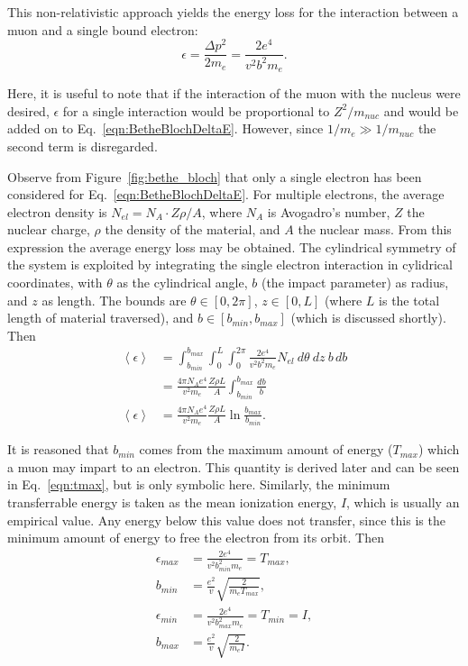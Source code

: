 This non-relativistic approach yields the energy loss for the interaction between a muon and a single bound electron:
\begin{equation}\label{eqn:BetheBlochDeltaE}
\epsilon=\frac{\Delta p^2}{2m_e}=\frac{2e^4}{v^2 b^2 m_e}.
\end{equation}

Here, it is useful to note that if the interaction of the muon with the nucleus were desired, $\epsilon$ for a single interaction would be proportional to $Z^2/m_{nuc}$ and would be added on to Eq.~\eqref{eqn:BetheBlochDeltaE}. However, since $1/m_e \gg 1/m_{nuc}$ the second term is disregarded.

Observe from Figure~\ref{fig:bethe_bloch} that only a single electron has been considered for Eq.~\eqref{eqn:BetheBlochDeltaE}. For multiple electrons, the average electron density is $N_{el}=N_A\cdot Z\rho/A$, where $N_A$ is Avogadro's number, $Z$ the nuclear charge, $\rho$ the density of the material, and $A$ the nuclear mass. From this expression the average energy loss may be obtained. The cylindrical symmetry of the system is exploited by integrating the single electron interaction in cylidrical coordinates, with $\theta$ as the cylindrical angle, $b$ (the impact parameter) as radius, and $z$ as length. The bounds are $\theta \in [0,2\pi]$, $z\in[0,L]$ (where $L$ is the total length of material traversed), and $b\in[b_{min},b_{max}]$ (which is discussed shortly). Then
\begin{align}
\left<\epsilon\right>&=\int_{b_{min}} ^{b_{max}} \int_0 ^L \int_0 ^{2\pi}  \frac{2e^4}{v^2b^2m_e}N_{el}\: d\theta \: dz\: b \,db \nonumber\\
&=\frac{4\pi N_A e^4}{v^2 m_e}\frac{Z\rho L}{A}\int_{b_{min}} ^{b_{max}} \frac{db}{b}\nonumber\\
\left<\epsilon\right> &= \frac{4\pi N_A e^4}{v^2 m_e} \frac{Z\rho L}{A} \ln{\frac{b_{max}}{b_{min}}}. \label{eqn:BetheBlochIntermediate}
\end{align}

It is reasoned that $b_{min}$ comes from the maximum amount of energy ($T_{max}$) which a muon may impart to an electron. This quantity is derived later and can be seen in Eq.~\eqref{eqn:tmax}, but is only symbolic here. Similarly, the minimum transferrable energy is taken as the mean ionization energy, $I$, which is usually an empirical value. Any energy below this value does not transfer, since this is the minimum amount of energy to free the electron from its orbit. Then
\begin{align*}
\epsilon_{max}&=\frac{2e^4}{v^2b_{min} ^2 m_e}=T_{max},\\
b_{min}&=\frac{e^2}{v}\sqrt{\frac{2}{m_e T_{max}}},\\[12pt]
\epsilon_{min}&=\frac{2e^4}{v^2b_{max} ^2 m_e}=T_{min}=I,\\
b_{max}&=\frac{e^2}{v}\sqrt{\frac{2}{m_e I}}.
\end{align*}

